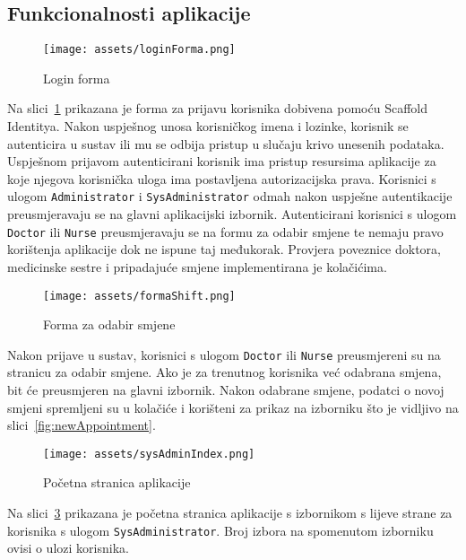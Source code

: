 \subsection{Funkcionalnosti aplikacije}

\begin{figure}[H]
	\texttt{[image: assets/loginForma.png]}
	\centering
	\caption{Login forma}
	\label{fig:loginForm}
\end{figure}

Na slici~\ref{fig:loginForm} prikazana je forma za prijavu korisnika dobivena pomoću Scaffold Identitya. Nakon uspješnog unosa korisničkog imena i lozinke, korisnik se autenticira u sustav ili mu se odbija pristup u slučaju krivo unesenih podataka. Uspješnom prijavom autenticirani korisnik ima pristup resursima aplikacije za koje njegova korisnička uloga ima postavljena autorizacijska prava. Korisnici s ulogom \texttt{Administrator} i \texttt{SysAdministrator} odmah nakon uspješne autentikacije preusmjeravaju se na glavni aplikacijski izbornik. Autenticirani korisnici s ulogom \texttt{Doctor} ili \texttt{Nurse} preusmjeravaju se na formu za odabir smjene te nemaju pravo korištenja aplikacije dok ne ispune taj međukorak. Provjera poveznice doktora, medicinske sestre i pripadajuće smjene implementirana je kolačićima.

\begin{figure}[H]
	\texttt{[image: assets/formaShift.png]}
	\centering
	\caption{Forma za odabir smjene}
	\label{fig:shiftForm}
\end{figure}

Nakon prijave u sustav, korisnici s ulogom \texttt{Doctor} ili \texttt{Nurse} preusmjereni su na stranicu za odabir smjene. Ako je za trenutnog korisnika već odabrana smjena, bit će preusmjeren na glavni izbornik. Nakon odabrane smjene, podatci o novoj smjeni spremljeni su u kolačiće i korišteni za prikaz na izborniku što je vidljivo na slici~\ref{fig:newAppointment}.

\begin{figure}[H]
	\texttt{[image: assets/sysAdminIndex.png]}
	\centering
	\caption{Početna stranica aplikacije}
	\label{fig:homePage}
\end{figure}

Na slici~\ref{fig:homePage} prikazana je početna stranica aplikacije s izbornikom s lijeve strane za korisnika s ulogom \texttt{SysAdministrator}. Broj izbora na spomenutom izborniku ovisi o ulozi korisnika.

